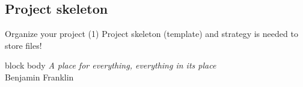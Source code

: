 \documentclass[10pt,aspectratio=169,notes]{beamer} %
\begin{document}
\subsection{Project skeleton}
\begin{frame}[t]{Organize your project (1)}
Project skeleton (template) and strategy is needed to store files!
\vspace{3mm}

\begin{beamercolorbox}[wd=0.8\textwidth,rounded=true,shadow=true]{block body}
	\emph{A place for everything, everything in its place}\\
	\flushright
	Benjamin Franklin
\end{beamercolorbox}
\vspace{3mm}


\end{frame}
\end{document}
